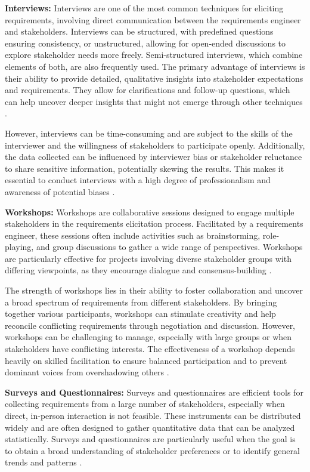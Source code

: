 \begin{refsection}
\textbf{Interviews:} Interviews are one of the most common techniques for eliciting requirements, involving direct communication between the requirements engineer and stakeholders. Interviews can be structured, with predefined questions ensuring consistency, or unstructured, allowing for open-ended discussions to explore stakeholder needs more freely. Semi-structured interviews, which combine elements of both, are also frequently used. The primary advantage of interviews is their ability to provide detailed, qualitative insights into stakeholder expectations and requirements. They allow for clarifications and follow-up questions, which can help uncover deeper insights that might not emerge through other techniques \cite[pp.~75-95]{kotonya1998requirements}.

However, interviews can be time-consuming and are subject to the skills of the interviewer and the willingness of stakeholders to participate openly. Additionally, the data collected can be influenced by interviewer bias or stakeholder reluctance to share sensitive information, potentially skewing the results. This makes it essential to conduct interviews with a high degree of professionalism and awareness of potential biases \cite[pp.~42-59]{rogers2023interaction}.

\textbf{Workshops:} Workshops are collaborative sessions designed to engage multiple stakeholders in the requirements elicitation process. Facilitated by a requirements engineer, these sessions often include activities such as brainstorming, role-playing, and group discussions to gather a wide range of perspectives. Workshops are particularly effective for projects involving diverse stakeholder groups with differing viewpoints, as they encourage dialogue and consensus-building \cite[pp.~120-138]{gottesdiener2002requirements}.

The strength of workshops lies in their ability to foster collaboration and uncover a broad spectrum of requirements from different stakeholders. By bringing together various participants, workshops can stimulate creativity and help reconcile conflicting requirements through negotiation and discussion. However, workshops can be challenging to manage, especially with large groups or when stakeholders have conflicting interests. The effectiveness of a workshop depends heavily on skilled facilitation to ensure balanced participation and to prevent dominant voices from overshadowing others \cite[pp.~64-82]{pohl2010requirements}.

\textbf{Surveys and Questionnaires:} Surveys and questionnaires are efficient tools for collecting requirements from a large number of stakeholders, especially when direct, in-person interaction is not feasible. These instruments can be distributed widely and are often designed to gather quantitative data that can be analyzed statistically. Surveys and questionnaires are particularly useful when the goal is to obtain a broad understanding of stakeholder preferences or to identify general trends and patterns \cite[pp.~101-116]{wiegers2013software}.


\end{refsection}
